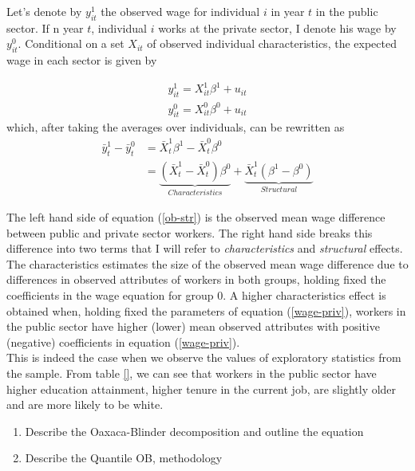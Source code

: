 \documentclass{article}
\begin{document}
\noindent
Let's denote by $y^{1}_{it}$ the observed wage for individual $i$ in year $t$ in the public sector. If n year $t$, individual $i$ works at the private sector, I denote his wage by $y^{0}_{it}$. Conditional on a set $X_{it}$ of observed individual characteristics, the expected wage in each sector is given by  

\begin{align}
    y_{it}^{1} = X_{it}^{1}\beta^{1}+u_{it}\\
    y_{it}^{0} = X_{it}^{0}\beta^{0}+u_{it} \label{wage-priv}
\end{align}
which, after taking the averages over individuals, can be rewritten as
\begin{align}
    \bar{y}_{t}^{1} - \bar{y}_{t}^{0} &= \bar{X}_{t}^{1}\beta^{1} -\bar{X}_{t}^{0}\beta^{0} \\
    &= \underbrace{\left(\bar{X}_{t}^{1}-\bar{X}_{t}^{0}\right)\beta^{0}}_{Characteristics} +\underbrace{\bar{X}_{t}^{1}\left(\beta^{1}-\beta^{0}\right)}_{Structural} \label{ob-str}
\end{align}      

\noindent
The left hand side of equation (\ref{ob-str}) is the observed mean wage difference between public and private sector workers. The right hand side breaks this difference into two terms that I will refer to \emph{characteristics} and \emph{structural} effects. The characteristics estimates the size of the observed mean wage difference due to differences in observed attributes of workers in both groups, holding fixed the coefficients in the wage equation for group $0$. A higher characteristics effect is obtained when, holding fixed the parameters of equation (\ref{wage-priv}), workers in the public sector have higher (lower) mean observed attributes with positive (negative) coefficients in equation (\ref{wage-priv}). \\

\noindent
This is indeed the case when we observe the values of exploratory statistics from the sample. From table \ref{}, we can see that workers in the public sector have higher education attainment, higher tenure in the current job, are slightly older and are more likely to be white.   

\begin{enumerate}
    \item Describe the Oaxaca-Blinder decomposition and outline the equation
    \item Describe the Quantile OB, methodology \cite{chernozhukov_inference_2013} 
\end{enumerate}
\end{document}
